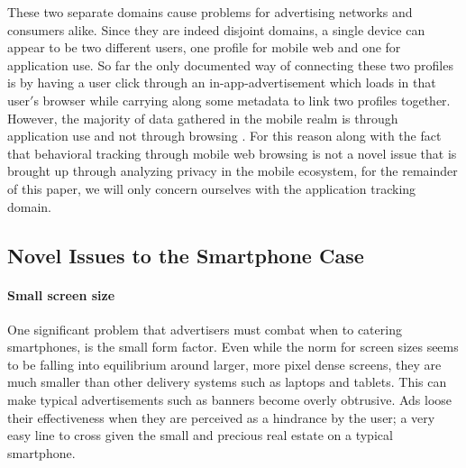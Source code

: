 
These two separate domains cause problems for advertising networks and consumers alike. Since they are indeed disjoint domains, a single device can appear to be two different users, one profile for mobile web and one for application use. So far the only documented way of connecting these two profiles is by having a user click through an in-app-advertisement which loads in that user$'$s browser while carrying along some metadata to link two profiles together\cite{Trust2013b}. 
However, the majority of data gathered in the mobile realm is through application use and not through browsing \cite{mobilevsapp}. For this reason along with the fact that behavioral tracking through mobile web browsing is not a novel issue that is brought up through analyzing privacy in the mobile ecosystem, for the remainder of this paper, we will only concern ourselves with the application tracking domain.



% 


	\subsection{Novel Issues to the Smartphone Case}

		\paragraph{Small screen size} %
One significant problem that advertisers must combat when to catering smartphones, is the small form factor. 
Even while the norm for screen sizes seems to be falling into equilibrium around larger, more pixel dense screens\cite{screensize}, they are much smaller than other delivery systems such as laptops and tablets. This can make typical advertisements such as banners become overly obtrusive. Ads loose their effectiveness when they are perceived as a hindrance by the user\cite{obtrusive}; a very easy line to cross given the small and precious real estate on a typical smartphone. 

